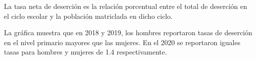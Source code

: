 La tasa neta de deserción es la relación porcentual entre el total de deserción en el ciclo escolar y la población matriclada en dicho ciclo.

La gráfica muestra que en 2018 y 2019, los hombres reportaron tasas de deserción en el nivel primario mayores que las mujeres. En el 2020 se reportaron iguales tasas para hombres y mujeres de 1.4 respectivamente. 